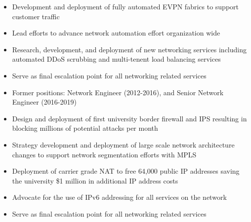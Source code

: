 \documentclass[10pt,letter,ragged2e]{altacv}
\begin{document}

\begin{fullwidth}
\makecvheader
\end{fullwidth}



\begin{itemize}
\item Development and deployment of fully automated EVPN fabrics to support customer traffic
\item Lead efforts to advance network automation effort organization wide
\item Research, development, and deployment of new networking services including automated DDoS
    scrubbing and multi-tenent load balancing services
\item Serve as final escalation point for all networking related services
\end{itemize}

\divider

\begin{itemize}
    \item Former positions: Network Engineer (2012-2016), and Senior
        Network Engineer (2016-2019)
\item Design and deployment of first university border firewall and IPS
    resulting in blocking millions of potential attacks per month
\item Strategy development and deployment of large scale network architecture
    changes to support network segmentation efforts with MPLS
\item Deployment of carrier grade NAT to free 64,000 public IP addresses
    saving the university \$1 million in additional IP address costs
\item Advocate for the use of IPv6 addressing for all services on the network
\item Serve as final escalation point for all networking related services
\end{itemize}
\end{document}
